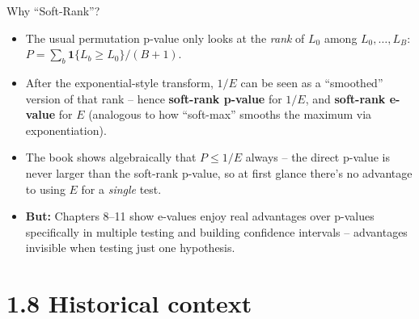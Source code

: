 \documentclass[aspectratio=169,10pt]{beamer}
\begin{document}
\begin{frame}{Why ``Soft-Rank''?}

\begin{itemize}
  \item The usual permutation p-value only looks at the \emph{rank} of
    $L_0$ among $L_0,\dots,L_B$: $P = \sum_b \mathbf{1}\{L_b\ge L_0\}/(B+1)$.
  \item After the exponential-style transform, $1/E$ can be seen as a
    ``smoothed'' version of that rank -- hence \textbf{soft-rank p-value}
    for $1/E$, and \textbf{soft-rank e-value} for $E$ (analogous to how
    ``soft-max'' smooths the maximum via exponentiation).
  \item The book shows algebraically that $P \le 1/E$ always -- the direct
    p-value is never larger than the soft-rank p-value, so at first glance
    there's no advantage to using $E$ for a \emph{single} test.
  \item \textbf{But:} Chapters 8--11 show e-values enjoy real advantages
    over p-values specifically in multiple testing and building confidence
    intervals -- advantages invisible when testing just one hypothesis.
\end{itemize}

\end{frame}

\section{1.8 Historical context}
\end{document}
